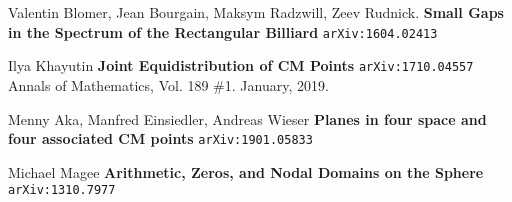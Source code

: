 \documentclass[12pt]{article}
\begin{document}
\vfill 

\begin{thebibliography}{}

\item Valentin Blomer, Jean Bourgain, Maksym Radzwill, Zeev Rudnick. \textbf{Small Gaps in the Spectrum of the Rectangular Billiard} \texttt{arXiv:1604.02413}

\item Ilya Khayutin \textbf{Joint Equidistribution of CM Points} \texttt{arXiv:1710.04557} \\
Annals of Mathematics,  Vol. 189 \#1.  January, 2019.

\item Menny Aka, Manfred Einsiedler, Andreas Wieser \textbf{Planes in four space and four associated CM points} \texttt{arXiv:1901.05833}

\item Michael Magee \textbf{Arithmetic, Zeros, and Nodal Domains on the Sphere} \texttt{arXiv:1310.7977}

\end{thebibliography}
\end{document}
